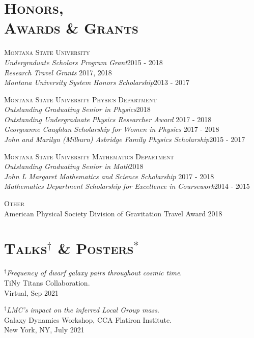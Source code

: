 \documentclass[margin]{res}
\begin{document}
\begin{resume}
	

\bigskip

\section{\textsc{Honors,\\ Awards \& Grants}}
{\textsc{Montana State University}}\\
{\sl Undergraduate Scholars Program Grant}\hfill	2015 - 2018\\
{\sl Research Travel Grants} \hfill	2017, 2018\\
{\sl Montana University System Honors Scholarship}\hfill		2013 - 2017

{\textsc{Montana State University Physics Department}}\\
{\sl Outstanding Graduating Senior in Physics}\hfill	2018\\
{\sl Outstanding Undergraduate Physics Researcher Award} \hfill        2017 - 2018  \\
{\sl Georgeanne Caughlan Scholarship for Women in Physics} \hfill        2017 - 2018 \\
{\sl John and Marilyn (Milburn) Asbridge Family Physics Scholarship}\hfill		2015 - 2017

{\textsc{Montana State University Mathematics Department}}\\
{\sl Outstanding Graduating Senior in Math}\hfill	2018\\
{\sl John L Margaret Mathematics and Science Scholarship} \hfill        2017 - 2018 \\
{\sl Mathematics Department Scholarship for Excellence in Coursework}\hfill 		2014 - 2015

{\textsc{Other}}\\
American Physical Society Division of Gravitation Travel Award \hfill 2018



\bigskip

\section{\textsc{Talks$^{\dagger}$ \& Posters$^{*}$}}
\emph{${}^{\dagger}$Frequency of dwarf galaxy pairs throughout cosmic time}. \\
TiNy Titans Collaboration.\\  
Virtual, Sep 2021

\emph{${}^{\dagger}$LMC's impact on the inferred 
Local Group mass}. \\
Galaxy Dynamics Workshop, CCA Flatiron Institute.\\  
New York, NY, July 2021


\end{resume}
\end{document}
